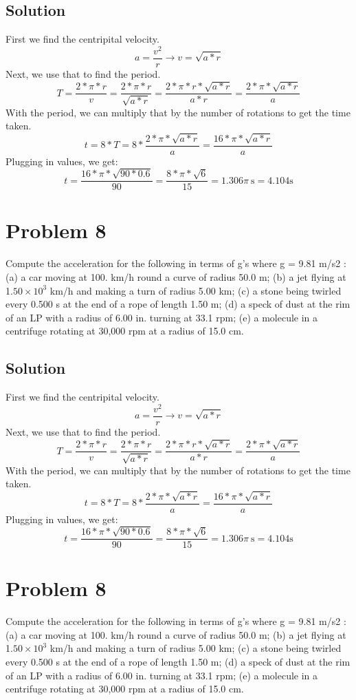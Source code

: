 \documentclass[12pt]{article}
\begin{document}
\subsection*{Solution}
First we find the centripital velocity.
\[ a = \frac{v^2}{r} \rightarrow v = \sqrt{a*r} \]
Next, we use that to find the period.
\[ T = \frac{2*\pi*r}{v} = \frac{2*\pi*r}{\sqrt{a*r}} = \frac{2*\pi*r*\sqrt{a*r}}{a*r} = \frac{2*\pi*\sqrt{a*r}}{a} \]
With the period, we can multiply that by the number of rotations to get the time taken.
\[ t = 8*T = 8*\frac{2*\pi*\sqrt{a*r}}{a} = \frac{16*\pi*\sqrt{a*r}}{a} \]
Plugging in values, we get:
\[ t = \frac{16*\pi*\sqrt{90*0.6}}{90} = \frac{8*\pi*\sqrt{6}}{15} = \boxed{1.306\pi\ \unit{\second} = 4.104 \unit{\second}} \]

\pagebreak
\section*{Problem 8}
Compute the acceleration for the following in terms of g's where g = 9.81 m/s2 : (a) a car
moving at 100. km/h round a curve of radius 50.0 m; (b) a jet flying at 1.$50\times10^3$ km/h and
making a turn of radius 5.00 km; (c) a stone being twirled every 0.500 s at the end of a rope of
length 1.50 m; (d) a speck of dust at the rim of an LP with a radius of 6.00 in. turning at 33.1
rpm; (e) a molecule in a centrifuge rotating at 30,000 rpm at a radius of 15.0 cm.
\subsection*{Solution}
First we find the centripital velocity.
\[ a = \frac{v^2}{r} \rightarrow v = \sqrt{a*r} \]
Next, we use that to find the period.
\[ T = \frac{2*\pi*r}{v} = \frac{2*\pi*r}{\sqrt{a*r}} = \frac{2*\pi*r*\sqrt{a*r}}{a*r} = \frac{2*\pi*\sqrt{a*r}}{a} \]
With the period, we can multiply that by the number of rotations to get the time taken.
\[ t = 8*T = 8*\frac{2*\pi*\sqrt{a*r}}{a} = \frac{16*\pi*\sqrt{a*r}}{a} \]
Plugging in values, we get:
\[ t = \frac{16*\pi*\sqrt{90*0.6}}{90} = \frac{8*\pi*\sqrt{6}}{15} = \boxed{1.306\pi\ \unit{\second} = 4.104 \unit{\second}} \]

\pagebreak
\section*{Problem 8}
Compute the acceleration for the following in terms of g's where g = 9.81 m/s2 : (a) a car
moving at 100. km/h round a curve of radius 50.0 m; (b) a jet flying at 1.$50\times10^3$ km/h and
making a turn of radius 5.00 km; (c) a stone being twirled every 0.500 s at the end of a rope of
length 1.50 m; (d) a speck of dust at the rim of an LP with a radius of 6.00 in. turning at 33.1
rpm; (e) a molecule in a centrifuge rotating at 30,000 rpm at a radius of 15.0 cm.
\end{document}
